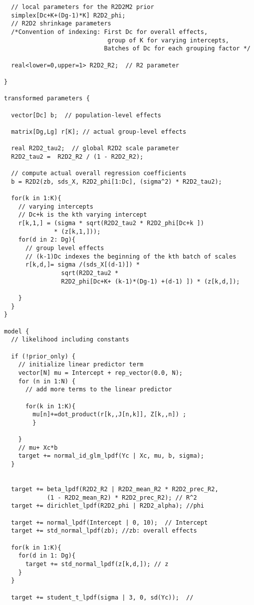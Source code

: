\begin{small}
\begin{verbatim}
  // local parameters for the R2D2M2 prior
  simplex[Dc+K+(Dg-1)*K] R2D2_phi;
  // R2D2 shrinkage parameters
  /*Convention of indexing: First Dc for overall effects,
                             group of K for varying intercepts,
                            Batches of Dc for each grouping factor */

  real<lower=0,upper=1> R2D2_R2;  // R2 parameter

}

transformed parameters {

  vector[Dc] b;  // population-level effects

  matrix[Dg,Lg] r[K]; // actual group-level effects

  real R2D2_tau2;  // global R2D2 scale parameter
  R2D2_tau2 =  R2D2_R2 / (1 - R2D2_R2);

  // compute actual overall regression coefficients
  b = R2D2(zb, sds_X, R2D2_phi[1:Dc], (sigma^2) * R2D2_tau2);

  for(k in 1:K){
    // varying intercepts
    // Dc+k is the kth varying intercept
    r[k,1,] = (sigma * sqrt(R2D2_tau2 * R2D2_phi[Dc+k ])
              * (z[k,1,]));
    for(d in 2: Dg){
      // group level effects
      // (k-1)Dc indexes the beginning of the kth batch of scales
      r[k,d,]= sigma /(sds_X[(d-1)]) *
                sqrt(R2D2_tau2 *
                R2D2_phi[Dc+K+ (k-1)*(Dg-1) +(d-1) ]) * (z[k,d,]);

    }
  }
}

model {
  // likelihood including constants

  if (!prior_only) {
    // initialize linear predictor term
    vector[N] mu = Intercept + rep_vector(0.0, N);
    for (n in 1:N) {
      // add more terms to the linear predictor

      for(k in 1:K){
        mu[n]+=dot_product(r[k,,J[n,k]], Z[k,,n]) ;
        }

    }
    // mu+ Xc*b
    target += normal_id_glm_lpdf(Yc | Xc, mu, b, sigma);
  }


  target += beta_lpdf(R2D2_R2 | R2D2_mean_R2 * R2D2_prec_R2,
            (1 - R2D2_mean_R2) * R2D2_prec_R2); // R^2
  target += dirichlet_lpdf(R2D2_phi | R2D2_alpha); //phi

  target += normal_lpdf(Intercept | 0, 10);  // Intercept
  target += std_normal_lpdf(zb); //zb: overall effects

  for(k in 1:K){
    for(d in 1: Dg){
      target += std_normal_lpdf(z[k,d,]); // z
    }
  }

  target += student_t_lpdf(sigma | 3, 0, sd(Yc));  //


\end{verbatim}
\end{small}
